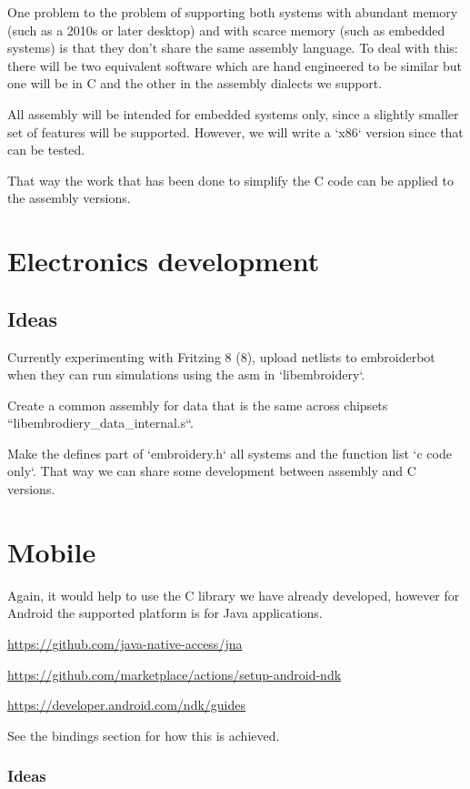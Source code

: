 \documentclass[10pt]{report}
\begin{document}
One problem to the problem of supporting both systems with abundant memory
(such as a 2010s or later desktop) and with scarce memory (such as embedded
systems) is that they don't share the same assembly language. To deal with
this: there will be two equivalent software which are hand engineered to be
similar but one will be in C and the other in the assembly dialects we support.

All assembly will be intended for embedded systems only, since a slightly
smaller set of features will be supported. However, we will write a
`x86` version since that can be tested.

That way the work that has been done to simplify the C code can be applied
to the assembly versions.

\chapter{Electronics development}

\section{Ideas}

Currently experimenting with Fritzing 8 (8), upload netlists to embroiderbot when
they can run simulations using the asm in `libembroidery`.

Create a common assembly for data that is the same across chipsets
``libembrodiery\_data\_internal.s``.

Make the defines part of `embroidery.h` all systems and the function list
`c code only`. That way we can share some development between assembly and C versions.

\chapter{Mobile}

Again, it would help to use the C library we have already developed,
however for Android the supported platform is for Java applications.

\url{https://github.com/java-native-access/jna}

\url{https://github.com/marketplace/actions/setup-android-ndk}

\url{https://developer.android.com/ndk/guides}

See the bindings section for how this is achieved.

\subsection{Ideas}
\end{document}
